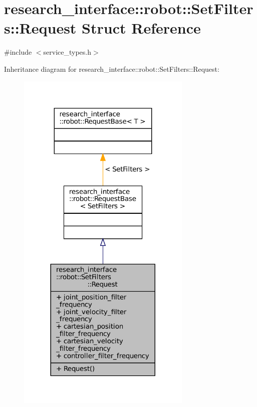 \hypertarget{structresearch__interface_1_1robot_1_1SetFilters_1_1Request}{}\section{research\+\_\+interface\+:\+:robot\+:\+:Set\+Filters\+:\+:Request Struct Reference}
\label{structresearch__interface_1_1robot_1_1SetFilters_1_1Request}


{\ttfamily \#include $<$service\+\_\+types.\+h$>$}



Inheritance diagram for research\+\_\+interface\+:\+:robot\+:\+:Set\+Filters\+:\+:Request\+:
\nopagebreak
\begin{figure}[H]
\begin{center}
\leavevmode
\includegraphics[width=236pt]{structresearch__interface_1_1robot_1_1SetFilters_1_1Request__inherit__graph}
\end{center}
\end{figure}


